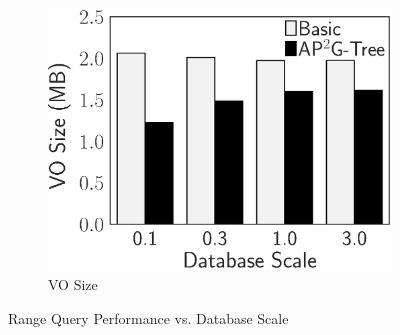 \begin{figure}[t]
\begin{subfigure}{.33\linewidth}
        \includegraphics[height=\ht\figbox]{exp-figs/access-control/scale_vo.eps}
        \caption{VO Size}\label{exp-fig:scale_vo}
    \end{subfigure}
    \caption{Range Query Performance vs. Database Scale}\label{exp-fig:access-control:scale}
\end{figure}
